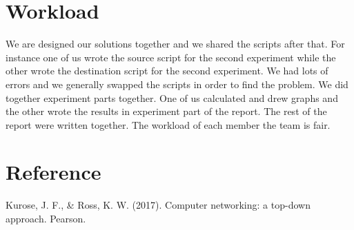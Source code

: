 \documentclass[conference]{IEEEtran}
\begin{document}
\section{Workload}
We are designed our solutions together and we shared the scripts after that. For instance one of us wrote the source script for the second experiment while the other wrote the destination script for the second experiment. We had lots of errors and we generally swapped the scripts in order to find the problem. We did together experiment parts together. One of us calculated and drew graphs and the other wrote the results in experiment part of the report. The rest of the report were written together. The workload of each member the team is fair.

\section{Reference}
Kurose, J. F., \& Ross, K. W. (2017). Computer networking: a top-down approach. Pearson.
\end{document}
